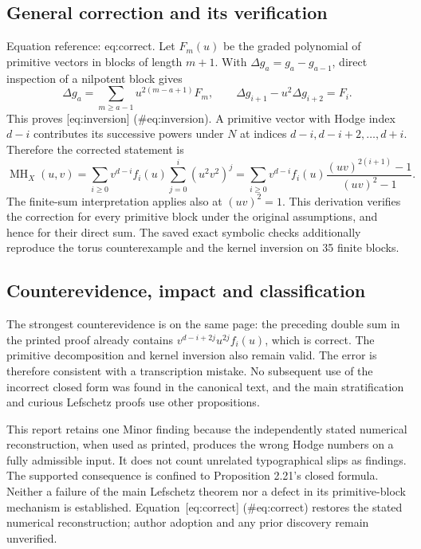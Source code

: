 \documentclass[10pt]{article}
\begin{document}
\subsection*{General correction and its verification}
Equation reference: eq:correct. Let \(F_m(u)\) be the graded polynomial of primitive vectors in blocks of length \(m+1\). With \(\Delta g_a=g_a-g_{a-1}\), direct inspection of a nilpotent block gives \[\Delta g_a=\sum_{m\ge a-1}u^{2(m-a+1)}F_m,\qquad
 \Delta g_{i+1}-u^2\Delta g_{i+2}=F_i.\] This proves [eq:inversion] (\#eq:inversion). A primitive vector with Hodge index \(d-i\) contributes its successive powers under \(N\) at indices \(d-i,d-i+2,\ldots,d+i\). Therefore the corrected statement is \[
 \operatorname{MH}_X(u,v)
 =\sum_{i\ge0}v^{d-i}f_i(u)\sum_{j=0}^i(u^2v^2)^j
 =\sum_{i\ge0}v^{d-i}f_i(u)
       \frac{(uv)^{2(i+1)}-1}{(uv)^2-1}.\] The finite-sum interpretation applies also at \((uv)^2=1\). This derivation verifies the correction for every primitive block under the original assumptions, and hence for their direct sum. The saved exact symbolic checks additionally reproduce the torus counterexample and the kernel inversion on 35 finite blocks.\par
\subsection*{Counterevidence, impact and classification}
The strongest counterevidence is on the same page: the preceding double sum in the printed proof already contains \(v^{d-i+2j}u^{2j}f_i(u)\), which is correct. The primitive decomposition and kernel inversion also remain valid. The error is therefore consistent with a transcription mistake. No subsequent use of the incorrect closed form was found in the canonical text, and the main stratification and curious Lefschetz proofs use other propositions.\par
This report retains one Minor finding because the independently stated numerical reconstruction, when used as printed, produces the wrong Hodge numbers on a fully admissible input. It does not count unrelated typographical slips as findings. The supported consequence is confined to Proposition 2.21’s closed formula. Neither a failure of the main Lefschetz theorem nor a defect in its primitive-block mechanism is established. Equation [eq:correct] (\#eq:correct) restores the stated numerical reconstruction; author adoption and any prior discovery remain unverified.\par
\end{document}
